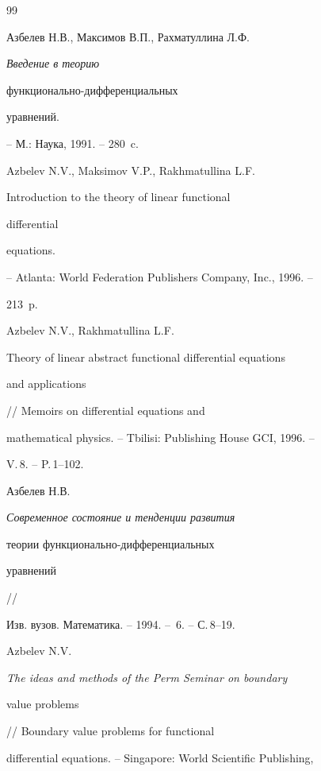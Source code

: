 \begin{thebibliography}{99}







Азбелев Н.В., Максимов В.П., Рахматуллина Л.Ф.


{\em Введение в теорию


функционально-дифференциальных


уравнений.} -- М.: Наука, 1991. -- 280~c.







Azbelev N.V., Maksimov V.P., Rakhmatullina L.F. {\em


Introduction to the theory of linear functional


differential


equations.} -- Atlanta: World Federation Publishers Company, Inc., 1996. --


213~p.







Azbelev N.V., Rakhmatullina L.F. {\em


Theory of linear abstract functional differential equations


and applications} // Memoirs on differential equations and


mathematical physics. -- Tbilisi: Publishing House GCI, 1996. --


V.\,8. -- P.\,1--102.







Азбелев Н.В. {\em Современное состояние и тенденции развития


теории функционально-дифференциальных


уравнений} //


Изв. вузов. Математика. -- 1994. -- \No\,6. -- С.\,8--19.







Azbelev N.V. {\em The ideas and methods of the Perm Seminar on boundary


value problems} // Boundary value problems for functional


differential equations. -- Singapore: World Scientific Publishing,



\end{thebibliography}
